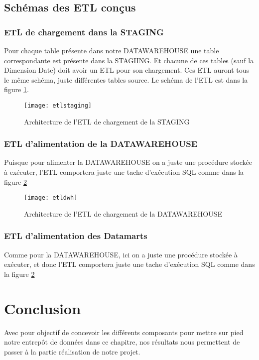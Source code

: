 \subsection{Schémas des ETL conçus }
\subsubsection{ETL de chargement dans la STAGING}
Pour chaque table présente dans notre DATAWAREHOUSE une table correspondante est présente dans la STAGIING. Et chacune de ces tables (sauf la Dimension Date) doit avoir un ETL pour son chargement. Ces ETL auront tous le même schéma, juste différentes tables source. Le schéma de l’ETL est dans la figure \ref{fig:etlstaging}. 

\begin{figure}[H]
    \centering
    \texttt{[image: etlstaging]}
    \caption{Architecture de l'ETL de chargement de la STAGING}
    \label{fig:etlstaging}
\end{figure}

\subsubsection{ETL d'alimentation de la DATAWAREHOUSE}
Puisque pour alimenter la DATAWAREHOUSE on a juste une procédure stockée à exécuter, l’ETL comportera juste une tache d’exécution SQL comme dans la figure \ref{fig:etldwh}

\begin{figure}[H]
    \centering
    \texttt{[image: etldwh]}
    \caption{Architecture de l'ETL de chargement de la DATAWAREHOUSE}
    \label{fig:etldwh}
\end{figure}

\subsubsection{ETL d'alimentation des Datamarts}
Comme pour la DATAWAREHOUSE, ici on a juste une procédure stockée à exécuter, et donc l’ETL comportera juste une tache d’exécution SQL comme dans la figure \ref{fig:etldwh}





\section*{Conclusion}%
%
Avec pour objectif de concevoir les différents composants pour mettre sur pied notre entrepôt de données dans ce chapitre, nos résultats nous permettent de passer à la partie réalisation de notre projet.


